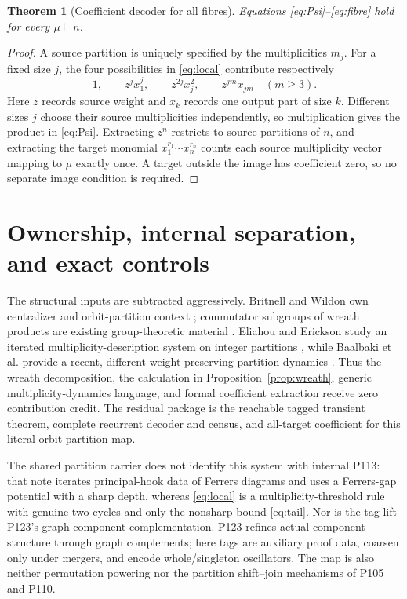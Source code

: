 \documentclass[10pt,a4paper]{amsart}
\newtheorem{theorem}{Theorem}[section]
\theoremstyle{definition}
\theoremstyle{remark}
\begin{document}
\begin{theorem}[Coefficient decoder for all fibres]\label{thm:fibre}
Equations \eqref{eq:Psi}--\eqref{eq:fibre} hold for every
$\mu\vdash n$.
\end{theorem}

\begin{proof}
A source partition is uniquely specified by the multiplicities $m_j$.
For a fixed size $j$, the four possibilities in \eqref{eq:local} contribute
respectively
\[
 1,\qquad z^jx_1^j,\qquad z^{2j}x_j^2,\qquad
 z^{jm}x_{jm}\quad(m\geq3).
\]
Here $z$ records source weight and $x_k$ records one output part of size
$k$.  Different sizes $j$ choose their source multiplicities independently,
so multiplication gives the product in \eqref{eq:Psi}.  Extracting $z^n$
restricts to source partitions of $n$, and extracting the target monomial
$x_1^{r_1}\cdots x_n^{r_n}$ counts each source multiplicity vector mapping
to $\mu$ exactly once.  A target outside the image has coefficient zero,
so no separate image condition is required.
\end{proof}

\section{Ownership, internal separation, and exact controls}

The structural inputs are subtracted aggressively.  Britnell and Wildon
own centralizer and orbit-partition context \cite{BritnellWildon2014};
commutator subgroups of wreath products are existing group-theoretic
material \cite{Skuratovskii2019}.  Eliahou and Erickson study an iterated
multiplicity-description system on integer partitions
\cite{EliahouErickson2013}, while Baalbaki et al. provide a recent,
different weight-preserving partition dynamics
\cite{BaalbakiEtAl2024}.  Thus the wreath decomposition, the calculation in
Proposition~\ref{prop:wreath}, generic multiplicity-dynamics language, and
formal coefficient extraction receive zero contribution credit.  The
residual package is the reachable tagged transient theorem, complete
recurrent decoder and census, and all-target coefficient for this literal
orbit-partition map.

The shared partition carrier does not identify this system with internal
P113: that note iterates principal-hook data of Ferrers diagrams and uses a
Ferrers-gap potential with a sharp depth, whereas \eqref{eq:local} is a
multiplicity-threshold rule with genuine two-cycles and only the nonsharp
bound \eqref{eq:tail}.  Nor is the tag lift P123's graph-component
complementation.  P123 refines actual component structure through graph
complements; here tags are auxiliary proof data, coarsen only under mergers,
and encode whole/singleton oscillators.  The map is also neither
permutation powering nor the partition shift--join mechanisms of P105 and
P110.
\end{document}
